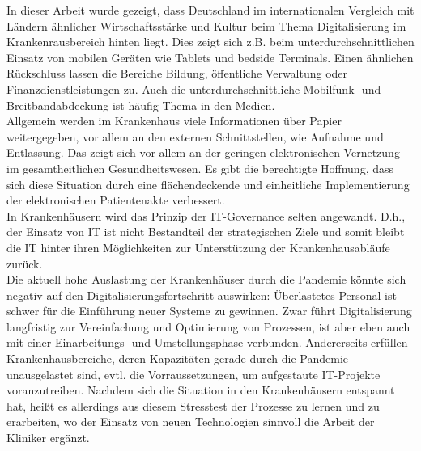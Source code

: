 In dieser Arbeit wurde gezeigt, dass Deutschland im internationalen Vergleich mit Ländern ähnlicher Wirtschaftsstärke und Kultur beim Thema Digitalisierung im Krankenrausbereich hinten liegt. Dies zeigt sich z.B. beim unterdurchschnittlichen Einsatz von mobilen Geräten wie Tablets und bedside Terminals. Einen ähnlichen Rückschluss lassen die Bereiche Bildung, öffentliche Verwaltung oder Finanzdienstleistungen zu. Auch die unterdurchschnittliche Mobilfunk- und Breitbandabdeckung ist häufig Thema in den Medien.\\

Allgemein werden im Krankenhaus viele Informationen über Papier weitergegeben, vor allem an den externen Schnittstellen, wie Aufnahme und Entlassung. Das zeigt sich vor allem an der geringen elektronischen Vernetzung im gesamtheitlichen Gesundheitswesen. Es gibt die berechtigte Hoffnung, dass sich diese Situation durch eine flächendeckende und einheitliche Implementierung der elektronischen Patientenakte verbessert.\\

In Krankenhäusern wird das Prinzip der IT-Governance selten angewandt. D.h., der Einsatz von IT ist nicht Bestandteil der strategischen Ziele und somit bleibt die IT hinter ihren Möglichkeiten zur Unterstützung der Krankenhausabläufe zurück.\\

Die aktuell hohe Auslastung der Krankenhäuser durch die Pandemie könnte sich negativ auf den Digitalisierungsfortschritt auswirken: Überlastetes Personal ist schwer für die Einführung neuer Systeme zu gewinnen. Zwar führt Digitalisierung langfristig zur Vereinfachung und Optimierung von Prozessen, ist aber eben auch mit einer Einarbeitungs- und Umstellungsphase verbunden. Andererseits erfüllen Krankenhausbereiche, deren Kapazitäten gerade durch die Pandemie unausgelastet sind, evtl. die Vorraussetzungen, um aufgestaute IT-Projekte voranzutreiben. Nachdem sich die Situation in den Krankenhäusern entspannt hat, heißt es allerdings aus diesem Stresstest der Prozesse zu lernen und zu erarbeiten, wo der Einsatz von neuen Technologien sinnvoll die Arbeit der Kliniker ergänzt.\\

